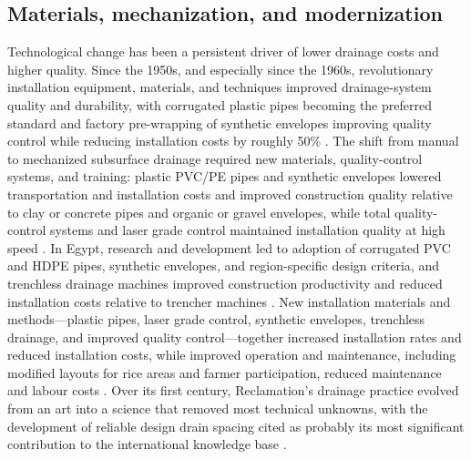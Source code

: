 \subsection{Materials, mechanization, and modernization}
Technological change has been a persistent driver of lower drainage costs and higher quality. Since the 1950s, and especially since the 1960s, revolutionary installation equipment, materials, and techniques improved drainage-system quality and durability, with corrugated plastic pipes becoming the preferred standard and factory pre-wrapping of synthetic envelopes improving quality control while reducing installation costs by roughly 50\% \parencite{Yannopoulos2020}. The shift from manual to mechanized subsurface drainage required new materials, quality-control systems, and training: plastic PVC/PE pipes and synthetic envelopes lowered transportation and installation costs and improved construction quality relative to clay or concrete pipes and organic or gravel envelopes, while total quality-control systems and laser grade control maintained installation quality at high speed \parencite{Ritzema2006}. In Egypt, research and development led to adoption of corrugated PVC and HDPE pipes, synthetic envelopes, and region-specific design criteria, and trenchless drainage machines improved construction productivity and reduced installation costs relative to trencher machines \parencite{AbdelDayem2007}. New installation materials and methods---plastic pipes, laser grade control, synthetic envelopes, trenchless drainage, and improved quality control---together increased installation rates and reduced installation costs, while improved operation and maintenance, including modified layouts for rice areas and farmer participation, reduced maintenance and labour costs \parencite{Ritzema2007}. Over its first century, Reclamation's drainage practice evolved from an art into a science that removed most technical unknowns, with the development of reliable design drain spacing cited as probably its most significant contribution to the international knowledge base \parencite{TeKrony2004}.

